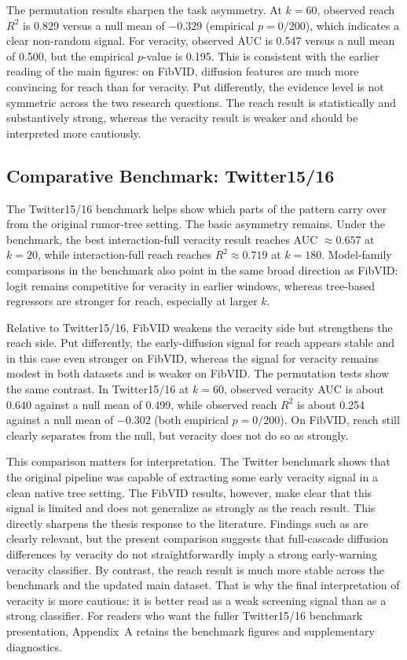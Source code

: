 The permutation results sharpen the task asymmetry. At $k=60$, observed reach $R^2$ is 0.829 versus a null mean of $-0.329$ (empirical $p=0/200$), which indicates a clear non-random signal. For veracity, observed AUC is 0.547 versus a null mean of 0.500, but the empirical $p$-value is 0.195. This is consistent with the earlier reading of the main figures: on FibVID, diffusion features are much more convincing for reach than for veracity. Put differently, the evidence level is not symmetric across the two research questions. The reach result is statistically and substantively strong, whereas the veracity result is weaker and should be interpreted more cautiously.

\subsection{Comparative Benchmark: Twitter15/16}
The Twitter15/16 benchmark helps show which parts of the pattern carry over from the original rumor-tree setting. The basic asymmetry remains. Under the benchmark, the best interaction-full veracity result reaches AUC $\approx 0.657$ at $k=20$, while interaction-full reach reaches $R^2 \approx 0.719$ at $k=180$. Model-family comparisons in the benchmark also point in the same broad direction as FibVID: logit remains competitive for veracity in earlier windows, whereas tree-based regressors are stronger for reach, especially at larger $k$.

Relative to Twitter15/16, FibVID weakens the veracity side but strengthens the reach side. Put differently, the early-diffusion signal for reach appears stable and in this case even stronger on FibVID, whereas the signal for veracity remains modest in both datasets and is weaker on FibVID. The permutation tests show the same contrast. In Twitter15/16 at $k=60$, observed veracity AUC is about 0.640 against a null mean of 0.499, while observed reach $R^2$ is about 0.254 against a null mean of $-0.302$ (both empirical $p=0/200$). On FibVID, reach still clearly separates from the null, but veracity does not do so as strongly.

This comparison matters for interpretation. The Twitter benchmark shows that the original pipeline was capable of extracting some early veracity signal in a clean native tree setting. The FibVID results, however, make clear that this signal is limited and does not generalize as strongly as the reach result. This directly sharpens the thesis response to the literature. Findings such as \citet{vosoughi_spread_2018} are clearly relevant, but the present comparison suggests that full-cascade diffusion differences by veracity do not straightforwardly imply a strong early-warning veracity classifier. By contrast, the reach result is much more stable across the benchmark and the updated main dataset. That is why the final interpretation of veracity is more cautious: it is better read as a weak screening signal than as a strong classifier.
For readers who want the fuller Twitter15/16 benchmark presentation, Appendix~A retains the benchmark figures and supplementary diagnostics.

